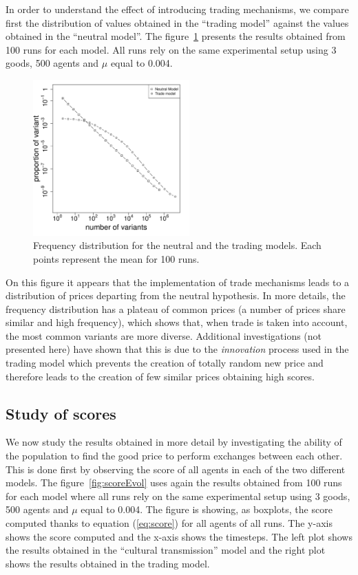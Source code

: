 \documentclass{wscpaperproc}
\begin{document}
In order to understand the effect of introducing trading mechanisms, we compare first the distribution of values obtained in the ``trading model'' against the values obtained in the ``neutral model''. The figure~\ref{fig:2setDi} presents the results obtained from 100 runs for each model. All runs rely on the same experimental setup using 3 goods, 500 agents and $\mu$ equal to 0.004. 

\begin{figure}[h]
	\begin{center}
		\includegraphics[width=6cm]{img/2SetupDistrib.pdf}
	\end{center}
	\caption{Frequency distribution for the neutral and the trading models. Each points represent the mean for 100 runs.}
	\label{fig:2setDi}
\end{figure}

On this figure it appears that the implementation of trade mechanisms leads to a distribution of prices departing from the neutral hypothesis. In more details, the frequency distribution has a plateau of common prices (a number of prices share similar and high frequency), which shows that, when trade is taken into account, the most common variants are more diverse. Additional investigations (not presented here) have shown that this is due to the \emph{innovation} process used in the trading model which prevents the creation of totally random new price and therefore leads to the creation of few similar prices obtaining high scores.


\subsection{Study of scores}

We now study the results obtained in more detail by investigating the ability of the population to find the good price to perform exchanges between each other. This is done first by observing the score of all agents in each of the two different models. The figure~\ref{fig:scoreEvol} uses again the results obtained from 100 runs for each model where all runs rely on the same experimental setup using 3 goods, 500 agents and $\mu$ equal to 0.004. The figure is showing, as boxplots, the score computed thanks to equation (\ref{eq:score}) for all agents of all runs. The y-axis shows the score computed and the x-axis shows the timesteps. The left plot shows the results obtained in the ``cultural transmission'' model and the right plot shows the results obtained in the trading model.
\end{document}

